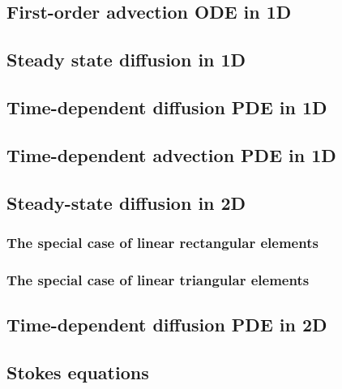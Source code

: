 

\subsection{First-order advection ODE in 1D} 
\subsection{Steady state diffusion in 1D \label{ss:dgss1D}} 
\subsection{Time-dependent diffusion PDE in 1D} 

\newpage
\subsection{Time-dependent advection PDE in 1D \label{ss:dgfem1D_adv}}  %

\newpage
\subsection{Steady-state diffusion in 2D} 
\subsubsection{The special case of linear rectangular elements} 
\subsubsection{The special case of linear triangular elements} 
%

\subsection{Time-dependent diffusion PDE in 2D}

\newpage
\subsection{Stokes equations} 

